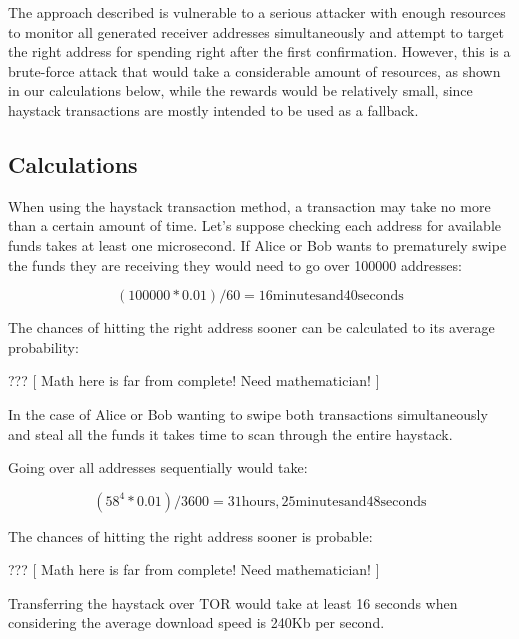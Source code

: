 \documentclass[a4paper]{article}
\begin{document}
The approach described is vulnerable to a serious attacker with enough resources to monitor all generated receiver addresses simultaneously and attempt to target the right address for spending right after the first confirmation. However, this is a brute-force attack that would take a considerable amount of resources, as shown in our calculations below, while the rewards would be relatively small, since haystack transactions are mostly intended to be used as a fallback.

\subsection{Calculations}

When using the haystack transaction method, a transaction may take no more than a certain amount of time. Let's suppose checking each address for available funds takes at least one microsecond. If Alice or Bob wants to prematurely swipe the funds they are receiving they would need to go over 100000 addresses:

\begin{displaymath}
	(100000 * 0.01) / 60 = \mathrm{16 minutes and 40 seconds}
\end{displaymath}

The chances of hitting the right address sooner can be calculated to its average probability: 

\begin{center}
	??? 	[ Math here is far from complete! Need mathematician! ]
\end{center}


In the case of Alice or Bob wanting to swipe both transactions simultaneously and steal all the funds it takes time to scan through the entire haystack.

Going over all addresses sequentially would take:

\begin{displaymath}
	(58^4 * 0.01) / 3600 = \mathrm{31 hours, 25 minutes and 48 seconds}
\end{displaymath}

The chances of hitting the right address sooner is probable:

\begin{center}
	??? 	[ Math here is far from complete! Need mathematician! ]
\end{center}

Transferring the haystack over TOR\cite{tor} would take at least 16 seconds when considering the average download speed is 240Kb per second.
\end{document}
